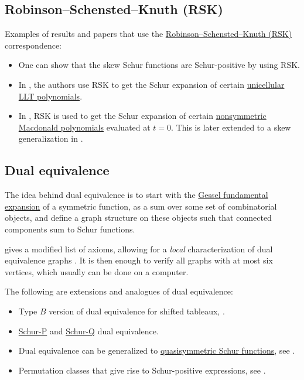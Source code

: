 \subsection[schurPositivityRSK]{Robinson--Schensted--Knuth (RSK)}

Examples of results and papers that use the
\hyperref[rsk]{Robinson--Schensted--Knuth (RSK)} correspondence:

\begin{itemize}
\item 
One can show that the skew Schur functions are 
Schur-positive by using RSK.

\item 
In \cite{HuhNamYoo2020}, the authors use RSK to get the Schur expansion of 
certain \hyperref[unicellularLLT]{unicellular LLT polynomials}.

\item 
In \cite{AlexanderssonSawhney2017}, RSK is used to get the Schur expansion of
certain \hyperref[macdonaldE]{nonsymmetric Macdonald polynomials} evaluated at
$t=0$.
This is later extended to a skew generalization in \cite{AlexanderssonUhlin2020}.

\end{itemize}



\subsection[schurPositivityDualEquivalence]{Dual equivalence}

The idea behind dual equivalence is to start with the \hyperref[gessel]{Gessel
fundamental expansion} of a symmetric function, as a sum over some set of
combinatorial objects, and define a graph structure on these objects such that
connected components sum to Schur functions.

 gives a modified list of axioms, allowing for a \emph{local}
characterization of dual equivalence graphs \cite{Roberts2013}.
It is then enough to verify all graphs with at
most six vertices, which usually can be done on a computer.

The following are extensions and analogues of dual equivalence:

\begin{itemize}
\item 
Type $B$ version of dual equivalence for shifted tableaux,
\cite[Def.~4.5.1]{RobertsThesis}.

\item 
\hyperref[schurP]{Schur-P} and \hyperref[schurQ]{Schur-Q} dual equivalence.

\item 
Dual equivalence can be generalized to \hyperref[qSchur]{quasisymmetric Schur
functions},
see  \cite{Roberts2016}.

\item 
Permutation classes that give rise to Schur-positive expressions, see \cite{ElizaldeRoichman2016}.
\end{itemize}


